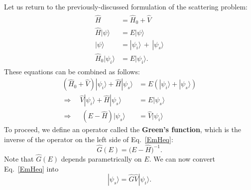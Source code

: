 \documentclass[prx,12pt]{revtex4-2}
\begin{document}
Let us return to the previously-discussed formulation of the
scattering problem:
\begin{align}
  \begin{aligned} \hat{H} &= \hat{H}_0+\hat{V} \\ \hat{H} |\psi\rangle &= E |\psi\rangle \\ |\psi\rangle &= |\psi_i\rangle \,+\, |\psi_s\rangle \\ \hat{H}_0 |\psi_i\rangle &= E |\psi_i\rangle.\end{aligned}
\end{align}
These equations can be combined as follows:
\begin{align}
  \left(\hat{H}_0 + \hat{V}\right) |\psi_i\rangle + \hat{H} |\psi_s\rangle &= E \left( |\psi_i\rangle + |\psi_s\rangle \right) \\
  \Rightarrow \quad \hat{V} |\psi_i\rangle + \hat{H} |\psi_s\rangle &= E |\psi_s\rangle  \\
  \Rightarrow \quad\; \left(E - \hat{H}\right) |\psi_s\rangle & = \hat{V} |\psi_i\rangle \label{EmHeq}
\end{align}
To proceed, we define an operator called the \textbf{Green's
  function}, which is the inverse of the operator on the left side of
Eq.~\eqref{EmHeq}:
\begin{equation}
  \hat{G}(E) = \big(E-\hat{H}\big)^{-1}.
  \label{Gdef}
\end{equation}
Note that $\hat{G}(E)$ depends parametrically on $E$.  We can now
convert Eq.~\eqref{EmHeq} into
\begin{equation}
  |\psi_s\rangle = \hat{G} \hat{V} |\psi_i\rangle.
  \label{scatterform}
\end{equation}
\end{document}
